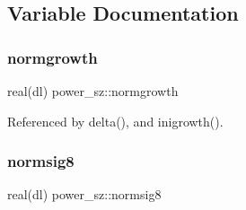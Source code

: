 \subsection{Variable Documentation}
\mbox{\label{namespacepower__sz_ad00d03b01e9af9747a7013d7ea680a25}} 
\subsubsection{\texorpdfstring{normgrowth}{normgrowth}}
{\footnotesize\ttfamily real(dl) power\+\_\+sz\+::normgrowth}



Referenced by delta(), and inigrowth().

\mbox{\label{namespacepower__sz_a9c2a55f8b77bacfff31fc7792410a4cc}} 
\subsubsection{\texorpdfstring{normsig8}{normsig8}}
{\footnotesize\ttfamily real(dl) power\+\_\+sz\+::normsig8}


